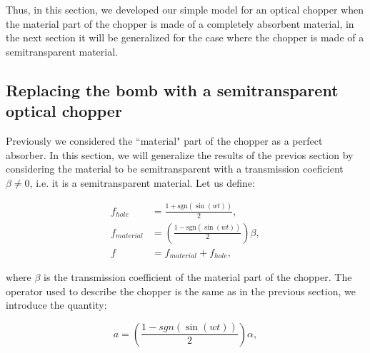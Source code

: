 \documentclass[12pt]{book}
\begin{document}
Thus, in this section, we developed our simple model for an optical chopper when the material part of the chopper is made of a completely absorbent material, in the next section it will be generalized for the case where the chopper is made of a semitransparent material.

\subsection{Replacing the bomb with a semitransparent optical chopper }

Previously we considered the ``material" part of the chopper as a perfect absorber. In this section,  we will generalize the results of the previos section by considering the material to be semitransparent with a transmission coeficient $\beta \neq 0$, i.e. it is a semitransparent material. Let us define: 
 

\begin{align}
f_{hole}&=\frac{1+\mathrm{sgn}(\sin(wt))}{2},\label{beta111}\\
f_{material}&=\left(\frac{1-\mathrm{sgn}(\sin(wt))}{2} \right)\beta,\label{beta11}\\
f&=f_{material}+f_{hole}, \label{beta1}
\end{align}


where $\beta$ is the transmission coefficient of the material part of the chopper. The operator used to describe the chopper is the same as in the previous section, we introduce the quantity:


\begin{equation}
a=\left(\frac{1-sgn(\sin(wt))}{2}\right) \alpha,
\end{equation}
\end{document}
